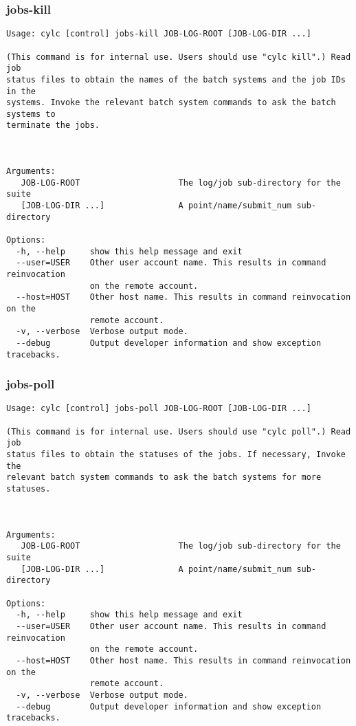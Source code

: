\subsubsection{jobs-kill}
\label{jobs-kill}
\begin{lstlisting}
Usage: cylc [control] jobs-kill JOB-LOG-ROOT [JOB-LOG-DIR ...]

(This command is for internal use. Users should use "cylc kill".) Read job
status files to obtain the names of the batch systems and the job IDs in the
systems. Invoke the relevant batch system commands to ask the batch systems to
terminate the jobs.



Arguments:
   JOB-LOG-ROOT                    The log/job sub-directory for the suite
   [JOB-LOG-DIR ...]               A point/name/submit_num sub-directory

Options:
  -h, --help     show this help message and exit
  --user=USER    Other user account name. This results in command reinvocation
                 on the remote account.
  --host=HOST    Other host name. This results in command reinvocation on the
                 remote account.
  -v, --verbose  Verbose output mode.
  --debug        Output developer information and show exception tracebacks.
\end{lstlisting}
\subsubsection{jobs-poll}
\label{jobs-poll}
\begin{lstlisting}
Usage: cylc [control] jobs-poll JOB-LOG-ROOT [JOB-LOG-DIR ...]

(This command is for internal use. Users should use "cylc poll".) Read job
status files to obtain the statuses of the jobs. If necessary, Invoke the
relevant batch system commands to ask the batch systems for more statuses.



Arguments:
   JOB-LOG-ROOT                    The log/job sub-directory for the suite
   [JOB-LOG-DIR ...]               A point/name/submit_num sub-directory

Options:
  -h, --help     show this help message and exit
  --user=USER    Other user account name. This results in command reinvocation
                 on the remote account.
  --host=HOST    Other host name. This results in command reinvocation on the
                 remote account.
  -v, --verbose  Verbose output mode.
  --debug        Output developer information and show exception tracebacks.
\end{lstlisting}
